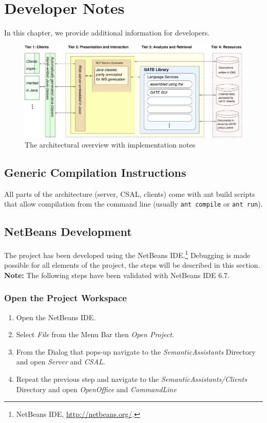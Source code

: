 \chapter{Developer Notes}
\label{chap:dev}
In this chapter, we provide additional information for developers. 
\begin{figure}[t]
  \centering
  \includegraphics[width=\textwidth]{pictures/arch_impl}
  \caption{The architectural overview with implementation notes}
  \label{fig:arch_impl}
  \vspace*{-0.4cm}
\end{figure}

\section{Generic Compilation Instructions}
All parts of the \sa architecture (server, CSAL, clients) come with
ant build scripts that allow compilation from the command line
(usually \texttt{ant compile} or \texttt{ant run}).

\section{NetBeans Development}
The project has been developed using the NetBeans
IDE.\footnote{NetBeans IDE, \url{http://netbeans.org/}.} Debugging is
  made possible for all elements of the project, the steps will be
  described in this section. \textbf{Note:} The following steps have
  been validated with NetBeans IDE 6.7.

\subsection{Open the Project Workspace}

\begin{enumerate}
  \item Open the NetBeans IDE.
  \item Select \emph{File} from the Menu Bar then \emph{Open Project}.
  \item From the Dialog that pops-up navigate to the \emph{SemanticAssistants} Directory and open \emph{Server} and \emph{CSAL}. 
  \item Repeat the previous step and navigate to the \emph{SemanticAssistants/Clients} Directory and open \emph{OpenOffice} and \emph{CommandLine} 
\end{enumerate}

